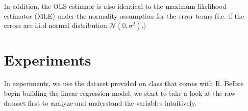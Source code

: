 In addition, the OLS estimaor is also identical to the maximum likelihood estimator (MLE) under the normality assumption for the error terms \cite{Abril07} (i.e. if the errors are i.i.d normal distribution $\mathcal{N}(0, \sigma^2)$.) 





\section{Experiments}

In experiments, we use the dataset provided on class that comes with R. Before begin building the linear regression model, we start to take a look at the raw dataset first to analyze and understand the variables intuitively. 



